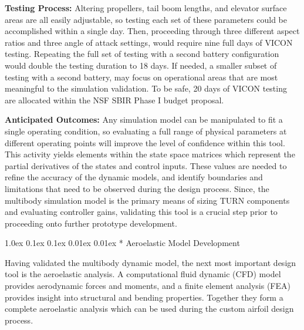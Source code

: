 \documentclass[11pt]{article}
\makeatletter
\renewcommand\subsection{
\@startsection{subsection}{2}{\z@}%
{1.0ex \@plus 0.1ex \@minus 0.1ex}%
{0.01ex \@plus 0.01ex}%
{\normalfont\Large\bfseries}}
\makeatother
\begin{document}
{\color{green} \bf Testing Process:}
Altering propellers, tail boom lengths, and elevator surface areas are all easily adjustable, so testing each set of these parameters could be accomplished within a single day.  Then, proceeding through three different aspect ratios and three angle of attack settings, would require nine full days of VICON testing.  Repeating the full set of testing with a second battery configuration would double the testing duration to 18 days.  If needed, a smaller subset of testing with a second battery, may focus on operational areas that are most meaningful to the simulation validation.  To be safe, 20 days of VICON testing are allocated within the NSF SBIR Phase I budget proposal.


{\color{green} \bf Anticipated Outcomes:}
Any simulation model can be manipulated to fit a single operating condition, so evaluating a full range of physical parameters at different operating points will improve the level of confidence within this tool.  This activity yields elements within the state space matrices which represent the partial derivatives of the states and control inputs.  These values are needed to refine the accuracy of the dynamic models, and identify boundaries and limitations that need to be observed during the design process.  Since, the multibody simulation model is the primary means of sizing TURN components and evaluating controller gains, validating this tool is a crucial step prior to proceeding onto further prototype development.




\subsection*{\color{green} Aeroelastic Model Development}

Having validated the multibody dynamic model, the next most important design tool is the aeroelastic analysis.  A computational fluid dynamic (CFD) model provides aerodynamic forces and moments, and a finite element analysis (FEA) provides insight into structural and bending properties.  Together they form a complete aeroelastic analysis which can be used during the custom airfoil design process.
\end{document}
